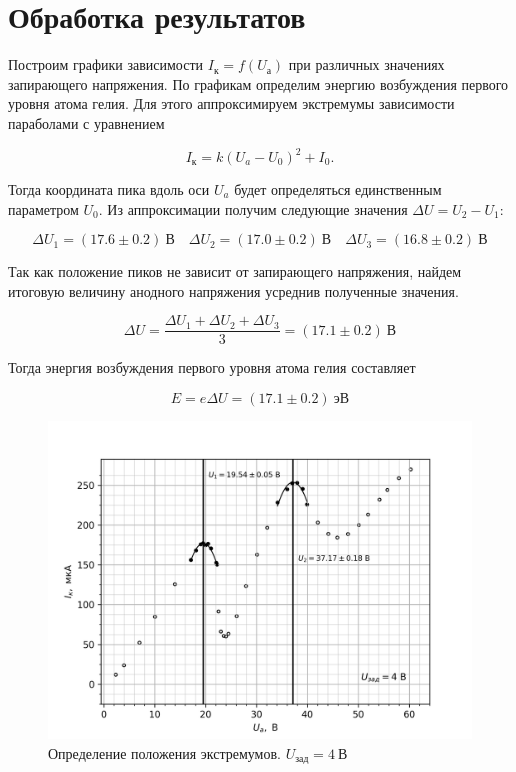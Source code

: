\documentclass[14pt, a4paper]{report}
\begin{document}
\section{Обработка результатов}

Построим графики зависимости $I_к=f(U_а)$ при различных значениях запирающего напряжения. По графикам определим энергию возбуждения первого уровня атома гелия. Для этого аппроксимируем экстремумы зависимости параболами с уравнением

\[I_к=k(U_a-U_0)^2+I_0\text{.}\]

Тогда координата пика вдоль оси $U_a$ будет определяться единственным параметром $U_0$. Из аппроксимации получим следующие значения $\Delta U=U_2-U_1$:

\[\Delta U_1=(17.6\pm0.2)\ В\quad \Delta U_2=(17.0\pm0.2)\ В\quad \Delta U_3=(16.8\pm0.2)\ В\]

Так как положение пиков не зависит от запирающего напряжения, найдем итоговую величину анодного напряжения усреднив полученные значения.

\[\Delta U=\frac{\Delta U_1+\Delta U_2+\Delta U_3}{3}=(17.1\pm0.2)\ В\]

Тогда энергия возбуждения первого уровня атома гелия составляет

\[E=e\Delta U=(17.1\pm0.2)\ эВ\]

\begin{figure}[H]
\centering
\includegraphics[scale=0.9]{../images/521-5}
\caption{Определение положения экстремумов. $U_{зад}=4\ \text{В}$}
\end{figure}
\end{document}
